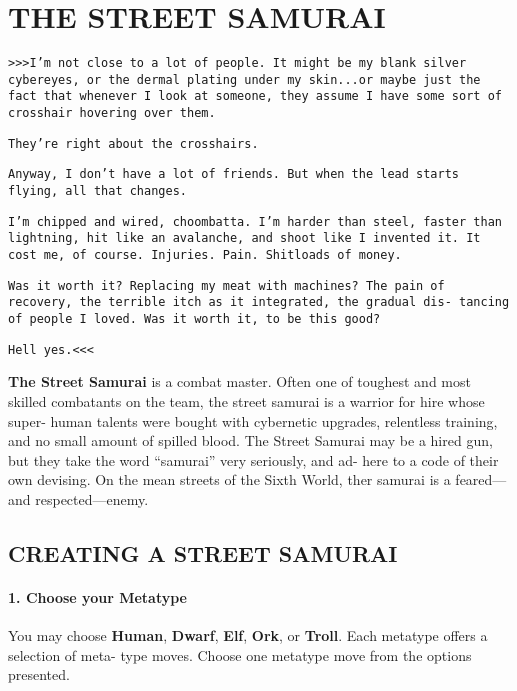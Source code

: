 
\section{THE STREET SAMURAI}
\begin{multicols}{3}
\setlength{\parskip}{.05cm}

\texttt{>>>I’m not close to a lot of people. It might be my blank
silver cybereyes, or the dermal plating under my skin...or
maybe just the fact that whenever I look at someone, they
assume I have some sort of crosshair hovering over them.}

\texttt{They’re right about the crosshairs.}

\texttt{Anyway, I don’t have a lot of friends. But when the lead starts
flying, all that changes.}

\texttt{I’m chipped and wired, choombatta. I’m harder than steel,
faster than lightning, hit like an avalanche, and shoot like I
invented it. It cost me, of course. Injuries. Pain. Shitloads of
money.}

\texttt{Was it worth it? Replacing my meat with machines? The pain
of recovery, the terrible itch as it integrated, the gradual dis-
tancing of people I loved. Was it worth it, to be this good?}

\texttt{Hell yes.<<<}

\textbf{The Street Samurai} is a combat master. Often one of
toughest and most skilled combatants on the team,
the street samurai is a warrior for hire whose super-
human talents were bought with cybernetic upgrades,
relentless training, and no small amount of spilled
blood. The Street Samurai may be a hired gun, but
they take the word “samurai” very seriously, and ad-
here to a code of their own devising. On the mean
streets of the Sixth World, ther samurai is a feared—
and respected—enemy.

\subsection{CREATING A STREET SAMURAI}

\paragraph{1.  Choose your Metatype}

You may choose \textbf{Human}, \textbf{Dwarf}, \textbf{Elf}, \textbf{Ork}, or
\textbf{Troll}. Each metatype offers a selection of meta-
type moves. Choose one metatype move from
the options presented.


\end{multicols}
